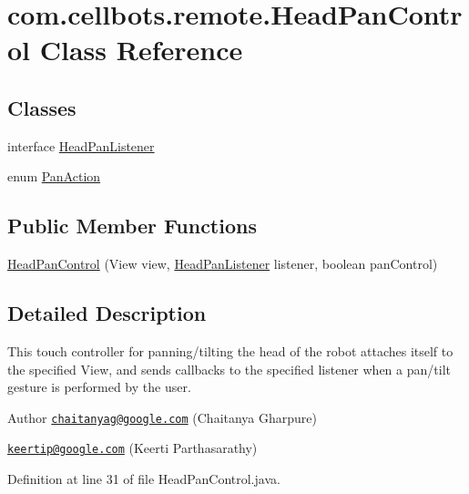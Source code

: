 \hypertarget{classcom_1_1cellbots_1_1remote_1_1_head_pan_control}{\section{com.\-cellbots.\-remote.\-Head\-Pan\-Control Class Reference}
\label{classcom_1_1cellbots_1_1remote_1_1_head_pan_control}
}
\subsection*{Classes}
\begin{DoxyCompactItemize}
\item 
interface \hyperlink{interfacecom_1_1cellbots_1_1remote_1_1_head_pan_control_1_1_head_pan_listener}{Head\-Pan\-Listener}
\item 
enum \hyperlink{enumcom_1_1cellbots_1_1remote_1_1_head_pan_control_1_1_pan_action}{Pan\-Action}
\end{DoxyCompactItemize}
\subsection*{Public Member Functions}
\begin{DoxyCompactItemize}
\item 
\hyperlink{classcom_1_1cellbots_1_1remote_1_1_head_pan_control_a8233a4fa19abaae34ddede2934251e34}{Head\-Pan\-Control} (View view, \hyperlink{interfacecom_1_1cellbots_1_1remote_1_1_head_pan_control_1_1_head_pan_listener}{Head\-Pan\-Listener} listener, boolean pan\-Control)
\end{DoxyCompactItemize}


\subsection{Detailed Description}
This touch controller for panning/tilting the head of the robot attaches itself to the specified View, and sends callbacks to the specified listener when a pan/tilt gesture is performed by the user.

\begin{DoxyAuthor}{Author}
\href{mailto:chaitanyag@google.com}{\tt chaitanyag@google.\-com} (Chaitanya Gharpure) 

\href{mailto:keertip@google.com}{\tt keertip@google.\-com} (Keerti Parthasarathy) 
\end{DoxyAuthor}


Definition at line 31 of file Head\-Pan\-Control.\-java.



